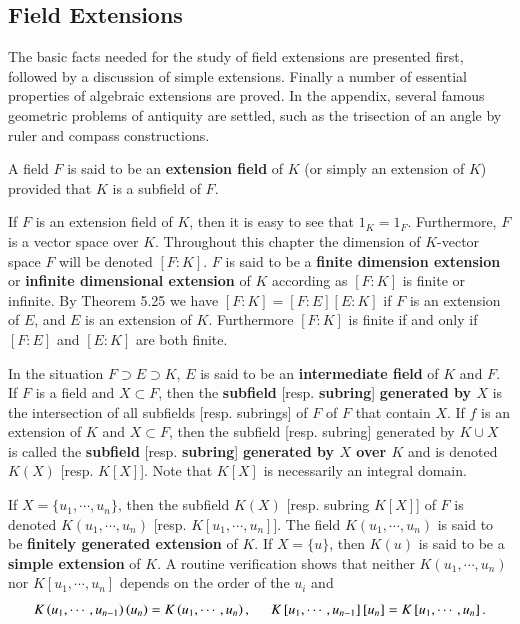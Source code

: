 \subsection{Field Extensions}
The basic facts needed for the study of field extensions are presented first, followed by a discussion of simple extensions. Finally a number of essential properties of algebraic extensions are proved. In the appendix, several famous geometric problems of antiquity are settled, such as the trisection of an angle by ruler and compass constructions.
\begin{definition}
A field $F$ is said to be an \textbf{extension field} of $K$ (or simply an extension of $K$) provided that $K$ is a subfield of $F$.
\end{definition}
If $F$ is an extension field of $K$, then it is easy to see that $1_K=1_F$. Furthermore, $F$ is a vector space over $K$. Throughout this chapter the dimension of $K$-vector space $F$ will be denoted $[F:K]$. $F$ is said to be a \textbf{finite dimension extension} or \textbf{infinite dimensional extension} of $K$ according as $[F:K]$ is finite or infinite. By Theorem 5.25 we have $[F:K]=[F:E][E:K]$ if $F$ is an extension of $E$, and $E$ is an extension of $K$. Furthermore $[F:K]$ is finite if and only if $[F:E]$ and $[E:K]$ are both finite.\par
In the situation $F\supset E\supset K$, $E$ is said to be an \textbf{intermediate field} of $K$ and $F$. If $F$ is a field and $X\subset F$, then the \textbf{subfield} [resp. \textbf{subring}] \textbf{generated by $X$} is the intersection of all subfields [resp. subrings] of $F$ of $F$ that contain $X$. If $f$ is an extension of $K$ and $X\subset F$, then the subfield [resp. subring] generated by $K\cup X$ is called the \textbf{subfield} [resp. \textbf{subring}] \textbf{generated by $X$ over $K$} and is denoted $K(X)$ [resp. $K[X]$]. Note that $K[X]$ is necessarily an integral domain.\par
If $X=\{u_1,\cdots,u_n\}$, then the subfield $K(X)$ [resp. subring $K[X]$] of $F$ is denoted $K(u_1,\cdots,u_n)$ [resp. $K[u_1,\cdots,u_n]$]. The field $K(u_1,\cdots,u_n)$ is said to be \textbf{finitely generated extension} of $K$. If $X=\{u\}$, then $K(u)$ is said to be a \textbf{simple extension} of $K$. A routine verification shows that neither $K(u_1,\cdots,u_n)$ nor $K[u_1,\cdots,u_n]$ depends on the order of the $u_i$ and 
$$
K\left( u_1,\cdots ,u_{n-1} \right) \left( u_n \right) =K\left( u_1,\cdots ,u_n \right) ,\hspace{0.5cm}K\left[ u_1,\cdots ,u_{n-1} \right] \left[ u_n \right] =K\left[ u_1,\cdots ,u_n \right] .
$$
